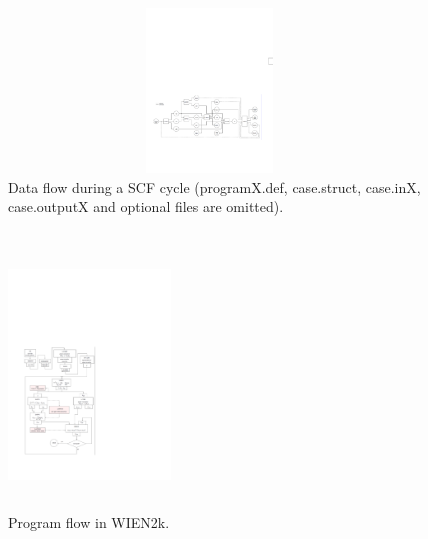 \documentclass[cjk,slidestop,compress,mathserif,blue]{beamer}
\begin{document}
\frame
{
\frametitle{}
\begin{figure}[h!]
\centering
\hspace*{-10pt}
\includegraphics[height=1.72in,width=4.2in,viewport=30 165 550 375,clip]{Figures/WIEN2k_Data_flow.pdf}
\caption{\small \textrm{Data flow during a SCF cycle (programX.def, case.struct, case.inX, case.outputX and optional files are omitted).}}%
\label{WIEN2k_Data_flow}
\end{figure}
}
\frame
{
\frametitle{}
\begin{figure}[h!]
\centering
\vspace*{-20pt}
\includegraphics[height=2.80in,width=1.70in,viewport=60 90 325 500,clip]{Figures/WIEN2k_Program_flow.pdf}
\caption{\small \textrm{Program flow in WIEN2k.}}%
\label{WIEN2k_program_flow}
\end{figure}
}
\end{document}
